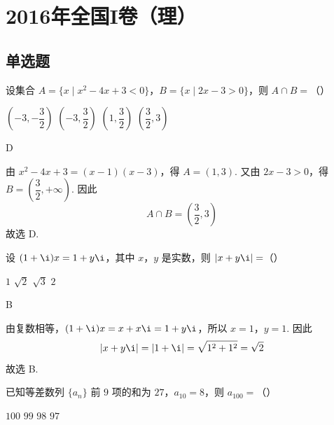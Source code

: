 

\chapter{2016年全国I卷（理）}

\section{单选题}

\begin{problem}
设集合 \(A=\{x\mid x^2-4x+3<0\}\)，\(B=\{x\mid 2x-3>0\}\)，则 \(A\cap B=\)（\quad）

\choices
    {\(\left(-3,-\dfrac32\right)\)}
    {\(\left(-3,\dfrac32\right)\)}
    {\(\left(1,\dfrac32\right)\)}
    {\(\left(\dfrac32,3\right)\)}
\end{problem}

\begin{answer}
D
\end{answer}

\begin{solution}
由 \(x^2-4x+3=(x-1)(x-3)\)，得 \(A=(1,3)\). 又由 \(2x-3>0\)，得 \(B=(\dfrac32,+\infty)\). 因此
\[
A\cap B=\left(\dfrac32,3\right)
\]
故选 D.
\end{solution}



\begin{problem}
设 \((1+\i)x=1+y\i\)，其中 \(x\)，\(y\) 是实数，则 \(|x+y\i|=\)（\quad）

\choices
    {\(1\)}
    {\(\sqrt2\)}
    {\(\sqrt3\)}
    {\(2\)}
\end{problem}

\begin{answer}
B
\end{answer}

\begin{solution}
由复数相等，\((1+\i)x=x+x\i=1+y\i\)，所以 \(x=1\)，\(y=1\). 因此
\[
|x+y\i|=|1+\i|=\sqrt{1^2+1^2}=\sqrt2
\]
故选 B.
\end{solution}



\begin{problem}
已知等差数列 \(\{a_n\}\) 前 \(9\) 项的和为 \(27\)，\(a_{10}=8\)，则 \(a_{100}=\)（\quad）

\choices
    {\(100\)}
    {\(99\)}
    {\(98\)}
    {\(97\)}
\end{problem}

